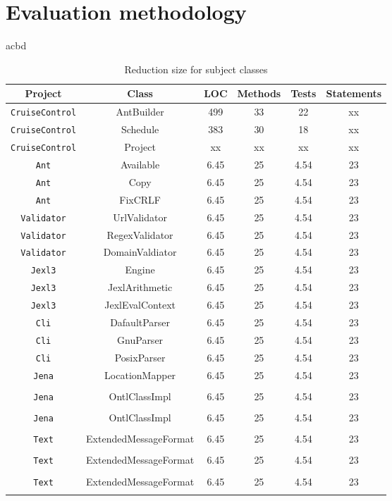 \section{Evaluation methodology}

acbd

\begin{table*}
\begin{center}
\begin{tabular}{|c||c|c|c|c|c|}
\hline
\hline

\hline
Project & Class & LOC & Methods & Tests & Statements \\
\hline
\hline
{\tt CruiseControl} & AntBuilder & 499 & 33 & 22 & xx\\
\hline
{\tt CruiseControl} & Schedule & 383 & 30 & 18 & xx\\
\hline
{\tt CruiseControl} & Project & xx & xx & xx & xx\\
\hline
{\tt Ant} & Available & 6.45 & 25 & 4.54 & 23\\
\hline
{\tt Ant} & Copy & 6.45 & 25 & 4.54 & 23\\
\hline
{\tt Ant} & FixCRLF & 6.45 & 25 & 4.54 & 23\\
\hline
{\tt Validator} & UrlValidator & 6.45 & 25 & 4.54 & 23\\
\hline
{\tt Validator} & RegexValidator & 6.45 & 25 & 4.54 & 23\\
\hline
{\tt Validator} & DomainValdiator & 6.45 & 25 & 4.54 & 23\\
\hline
{\tt Jexl3} & Engine & 6.45 & 25 & 4.54 & 23\\
\hline
{\tt Jexl3} & JexlArithmetic & 6.45 & 25 & 4.54 & 23\\
\hline
{\tt Jexl3} & JexlEvalContext & 6.45 & 25 & 4.54 & 23\\
\hline
{\tt Cli} & DafaultParser & 6.45 & 25 & 4.54 & 23\\
\hline
{\tt Cli} & GnuParser & 6.45 & 25 & 4.54 & 23\\
\hline
{\tt Cli} & PosixParser & 6.45 & 25 & 4.54 & 23\\
\hline
{\tt Jena} & LocationMapper & 6.45 & 25 & 4.54 & 23\\\\
\hline
{\tt Jena} & OntlClassImpl & 6.45 & 25 & 4.54 & 23\\\\
\hline
{\tt Jena} & OntlClassImpl & 6.45 & 25 & 4.54 & 23\\\\
\hline
{\tt Text} & ExtendedMessageFormat & 6.45 & 25 & 4.54 & 23\\\\
\hline
{\tt Text} & ExtendedMessageFormat & 6.45 & 25 & 4.54 & 23\\\\
\hline
{\tt Text} & ExtendedMessageFormat & 6.45 & 25 & 4.54 & 23\\\\

\hline
\hline
\end{tabular}
\end{center}
\caption{Reduction size for subject classes}
\label{tab:avgimproved}
\end{table*}



